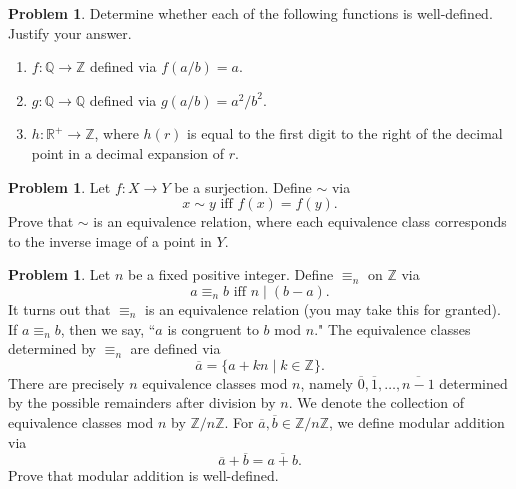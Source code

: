 \documentclass[11pt]{scrartcl}
\theoremstyle{definition}
\newtheorem{problem}[theorem]{Problem}
\begin{document}
\begin{problem}
Determine whether each of the following functions is well-defined.  Justify your answer.
\begin{enumerate}[label=\rm{(\alph*)}]
\item $f:\mathbb{Q}\to \mathbb{Z}$ defined via $f(a/b)=a$.
\item $g:\mathbb{Q}\to \mathbb{Q}$ defined via $g(a/b)=a^2/b^2$.
\item $h:\mathbb{R}^+\to \mathbb{Z}$, where $h(r)$ is equal to the first digit to the right of the decimal point in a decimal expansion of $r$.
\end{enumerate}
\end{problem}

\begin{problem}
Let $f:X\to Y$ be a surjection.  Define $\sim$ via
\[
x\sim y\text{ iff } f(x)=f(y).
\]
Prove that $\sim$ is an equivalence relation, where each equivalence class corresponds to the inverse image of a point in $Y$.
\end{problem}

\begin{problem}
Let $n$ be a fixed positive integer. Define $\equiv_n$ on $\mathbb{Z}$ via
\[
a\equiv_n b\text{ iff } n\mid(b-a).
\]
It turns out that $\equiv_n$ is an equivalence relation (you may take this for granted). If $a\equiv_n b$, then we say, ``$a$ is congruent to $b$ mod $n$." The equivalence classes determined by $\equiv_n$ are defined via
\[
\overline{a}=\{a+kn\mid k\in\mathbb{Z}\}.
\]
There are precisely $n$ equivalence classes mod $n$, namely $\overline{0},\overline{1},\ldots,\overline{n-1}$ determined by the possible remainders after division by $n$.  We denote the collection of equivalence classes mod $n$ by $\mathbb{Z}/n\mathbb{Z}$. For $\overline{a},\overline{b}\in\mathbb{Z}/n\mathbb{Z}$, we define modular addition via
\[
\overline{a}+\overline{b}=\overline{a+b}.
\]
Prove that modular addition is well-defined.
\end{problem}
\end{document}
